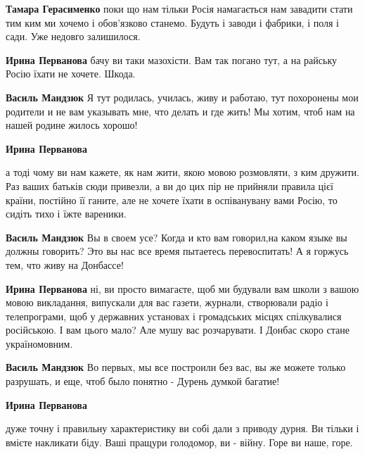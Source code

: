 \begin{itemize}
\begin{itemize}
\textbf{Тамара Герасименко} поки що нам тільки Росія намагається нам завадити
стати тим ким ми хочемо і обов'язково станемо. Будуть і заводи і фабрики, і
поля і сади. Уже недовго залишилося.

\textbf{Ирина Перванова} бачу ви таки мазохісти. Вам так погано тут, а на райську Росію їхати не хочете. Шкода.

\textbf{Василь Мандзюк} Я тут родилась, училась, живу и работаю, тут похоронены
мои родители и не вам указывать мне, что делать и где жить! Мы хотим, чтоб нам
на нашей родине жилось хорошо!

\textbf{Ирина Перванова} 

а тоді чому ви нам кажете, як нам жити, якою мовою розмовляти, з ким дружити.
Раз ваших батьків сюди привезли, а ви до цих пір не прийняли правила цієї
країни, постійно її ганите, але не хочете їхати в оспіванувану вами Росію, то
сидіть тихо і їжте вареники.


\textbf{Василь Мандзюк} Вы в своем усе? Когда и кто вам говорил,на каком языке
вы должны говорить? Это вы нас все время пытаетесь перевоспитать! А я горжусь
тем, что живу на Донбассе!

\textbf{Ирина Перванова} ні, ви просто вимагаєте, щоб ми будували вам школи з
вашою мовою викладання, випускали для вас газети, журнали, створювали радіо і
телепрограми, щоб у державних установах і громадських місцях спілкувалися
російською. І вам цього мало? Але мушу вас розчарувати. І Донбас скоро стане
україномовним.

\textbf{Василь Мандзюк} Во первых, мы все построили без вас, вы же можете только разрушать, и еще, чтоб было понятно - Дурень думкой багатие!

\textbf{Ирина Перванова} 

дуже точну і правильну характеристику ви собі дали з приводу дурня. Ви тільки і
вмієте накликати біду. Ваші пращури голодомор, ви - війну. Горе ви наше, горе.



\end{itemize}
\end{itemize}
